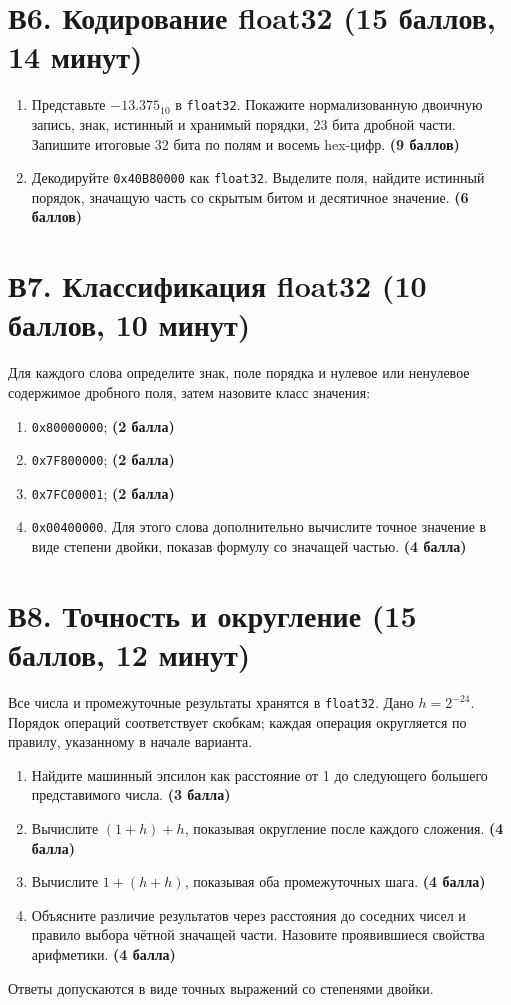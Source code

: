 \section{В6. Кодирование float32 (15 баллов, 14 минут)}\label{task:v6}
\begin{enumerate}
    \item Представьте $-13.375_{10}$ в \texttt{float32}. Покажите нормализованную двоичную запись, знак, истинный и хранимый порядки, 23 бита дробной части. Запишите итоговые 32 бита по полям и восемь hex-цифр. \textbf{(9 баллов)}
    \item Декодируйте \texttt{0x40B80000} как \texttt{float32}. Выделите поля, найдите истинный порядок, значащую часть со скрытым битом и десятичное значение. \textbf{(6 баллов)}
\end{enumerate}

\section{В7. Классификация float32 (10 баллов, 10 минут)}\label{task:v7}
Для каждого слова определите знак, поле порядка и нулевое или ненулевое содержимое дробного поля, затем назовите класс значения:
\begin{enumerate}
    \item \texttt{0x80000000}; \textbf{(2 балла)}
    \item \texttt{0x7F800000}; \textbf{(2 балла)}
    \item \texttt{0x7FC00001}; \textbf{(2 балла)}
    \item \texttt{0x00400000}. Для этого слова дополнительно вычислите точное значение в виде степени двойки, показав формулу со значащей частью. \textbf{(4 балла)}
\end{enumerate}

\section{В8. Точность и округление (15 баллов, 12 минут)}\label{task:v8}
Все числа и промежуточные результаты хранятся в \texttt{float32}. Дано $h=2^{-24}$. Порядок операций соответствует скобкам; каждая операция округляется по правилу, указанному в начале варианта.
\begin{enumerate}
    \item Найдите машинный эпсилон как расстояние от 1 до следующего большего представимого числа. \textbf{(3 балла)}
    \item Вычислите $(1+h)+h$, показывая округление после каждого сложения. \textbf{(4 балла)}
    \item Вычислите $1+(h+h)$, показывая оба промежуточных шага. \textbf{(4 балла)}
    \item Объясните различие результатов через расстояния до соседних чисел и правило выбора чётной значащей части. Назовите проявившиеся свойства арифметики. \textbf{(4 балла)}
\end{enumerate}
Ответы допускаются в виде точных выражений со степенями двойки.

